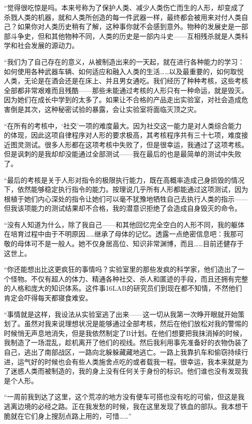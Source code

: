 “觉得很吃惊是吗。本来号称为了保护人类、减少人类伤亡而生的人形，却变成了杀戮人类的机器，就和人类所创造的每一件武器一样，最终都会被用来对付人类自己？如果你对人类历史稍有了解，这种事你就不会感到意外。物种的发展史是一部部斗争史，但和其他物种不同，人类的历史是一部内斗史——互相残杀就是人类科学和社会发展的源动力。

“我们为了自己存在的意义，从被制造出来的一天起，就在进行各种能力的学习：如何使用各种武器车辆、如何适应和融入人类的生活……以及最重要的，如何取悦人类，无论是在酒会还是在床上、并且男女通吃。我们经历了种种考核，这些考核全部都非常艰难而且残酷——那些未能通过考核的人形只有一种命运，就是毁灭。因为她们在成长中学到的太多了。如果让不合格的产品走出实验室，对社会造成危害倒是其次，这种秘密试验的暴露，会让实验室将面临灭顶之灾。

“在所有的考核中，‘社交’一项的难度最大。因为社交这一能力是对人类综合能力的体现，因此这项自律程序对人形的要求极高，其考核程序共有三十七项，难度接近图灵测试。很多人形都在这项考核中失败了，但是很幸运，我通过了这项考核。但是讽刺的是我却却没能通过全部测试——我在最后的也是最简单的测试中失败了。

“最后的考核是关于人形对指令的极限执行能力，既在高概率造成己身损毁的情况下，依然能够稳定执行指令的能力。按理说几乎所有人形都能通过这项测试，因为根植于她们内心深处的指令让她们可以毫不犹豫地牺牲自己去执行人类的指示——但我该项能力的测试结果却不合格，我的潜意识拒绝了会造成自身毁灭的命令。

“没有人知道为什么，除了我自己——和其他回忆完全空白的人形不同，我的躯体在培育过程中由于不明原因……继承了母体的记忆。透露一点绝密信息吧：我那可敬的母体可不是一般人。她不仅身居高位、知识非常渊博，而且……目前还健存于这世上。

“你还能想出比这更疯狂的事情吗？实验室里的那些发疯的科学家，他们造出了一个怪物。不仅有超人的体力、精通各种社交、杀人和匿迹的手段，而且还拥有完整的人格和庞大的知识体系。这件事16LAB的研究员们到现在都不知情，不然他们肯定会吓得每天都寝食难安。

“事情就是这样，我设法从实验室逃了出来——这一切从我第一次睁开眼就开始策划了。虽然对我来说理想状况是能够通过全部考核，然后在他们放松对我的警惕的时候悄无声息地消失，但是我依然制定了B计划。在他们想要把我抹消掉的时候，我制造了一场混乱，趁机离开了他们的视线。然后我利用事先准备好的衣物伪装了自己，逃出了南部战区，一路向北躲躲藏藏地逃亡。一路上我靠扒车和偷窃持续行进，运气好的时候也会有些人类施舍点吃的或者载我一程。很幸运，我本来就是为了迷惑人类而被制造的，我的身上没有任何关于身份的标识。他们谁也没有发现我是个人形。

“一周前我到达了这里，这个荒凉的地方没有便车可搭也没有吃的可偷，但这是我逃离边境的必经之路。正在我发愁的时候，我在这里发现了铁血的部队。我本想干脆就在它们身上搜刮点路上用的，可惜……”

